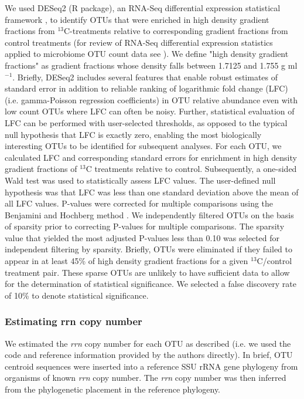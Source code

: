 \documentclass{article}
\begin{document}
We used DESeq2 (R package), an RNA-Seq differential expression statistical
framework \citep{love2014}, to identify OTUs that were enriched in high density
gradient fractions from $^{13}$C-treatments relative to corresponding gradient
fractions from control treatments (for review of RNA-Seq differential
expression statistics applied to microbiome OTU count data see
\citep{McMurdie2014}). We define "high density gradient fractions" as gradient
fractions whose density falls between 1.7125 and 1.755 g ml$^{-1}$.
Briefly, DESeq2 includes several features that enable robust estimates of standard error
in addition to reliable ranking of logarithmic fold change (LFC) (i.e.
gamma-Poisson regression coefficients) in OTU relative abundance even with low
count OTUs where LFC can often be noisy. Further, statistical evaluation of LFC
can be performed with user-selected thresholds, as opposed to the typical null
hypothesis that LFC is exactly zero, enabling the most biologically interesting
OTUs to be identified for subsequent analyses. For each OTU, we calculated LFC
and corresponding standard errors for enrichment in high density gradient
fractions of $^{13}$C treatments relative to control. Subsequently, a one-sided
Wald test was used to statistically assess LFC values. The user-defined null
hypothesis was that LFC was less than one standard deviation above the mean of
all LFC values. P-values were corrected for multiple comparisons using the
Benjamini and Hochberg method \citep{benjamini1995}. We independently filtered
OTUs on the basis of sparsity prior to correcting P-values for multiple
comparisons. The sparsity value that yielded the most adjusted P-values less
than 0.10 was selected for independent filtering by sparsity. Briefly, OTUs
were eliminated if they failed to appear in at least 45\% of high density
gradient fractions for a given $^{13}$C/control treatment pair. These sparse
OTUs are unlikely to have sufficient data to allow for the determination of
statistical significance. We selected a false discovery rate of 10\% to denote
statistical significance.

\subsubsection{Estimating rrn copy number}
We estimated the \textit{rrn} copy number for each OTU as described
\citep{Kembel_2012} (i.e. we used the code and reference information provided
by the authors \citep{Kembel_2012} directly). In brief, OTU centroid sequences
were inserted into a reference SSU rRNA gene phylogeny \citep{matsen2010} from
organisms of known \textit{rrn} copy number. The \textit{rrn} copy number was
then inferred from the phylogenetic placement in the reference phylogeny. 
\end{document}
